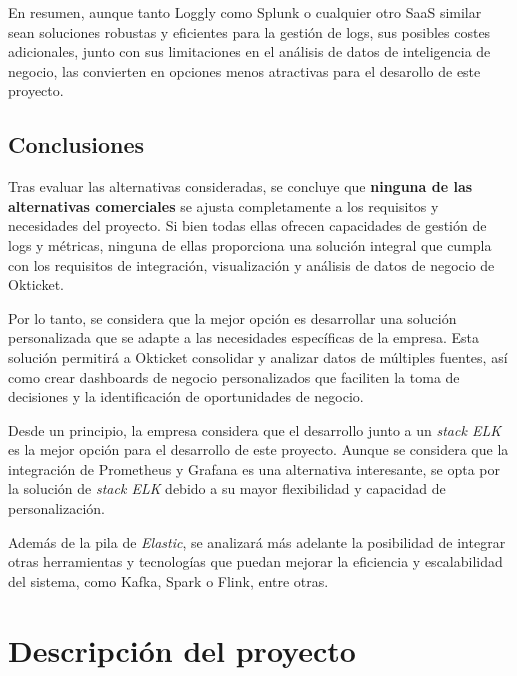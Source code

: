 \newpage{}
En resumen, aunque tanto Loggly como Splunk o cualquier otro SaaS similar
sean soluciones robustas y eficientes para la gestión de logs, sus posibles
costes adicionales, junto con sus limitaciones en el análisis de datos de
inteligencia de negocio, las convierten en opciones menos atractivas para el
desarollo de este proyecto.


\subsection{Conclusiones}
Tras evaluar las alternativas consideradas, se concluye que \textbf{ninguna de
las alternativas comerciales} se ajusta completamente a los requisitos y
necesidades del proyecto. Si bien todas ellas ofrecen capacidades de gestión de
logs y métricas, ninguna de ellas proporciona una solución integral que cumpla
con los requisitos de integración, visualización y análisis de datos de negocio
de Okticket.

Por lo tanto, se considera que la mejor opción es desarrollar una solución
personalizada que se adapte a las necesidades específicas de la empresa. Esta
solución permitirá a Okticket consolidar y analizar datos de múltiples fuentes,
así como crear dashboards de negocio personalizados que faciliten la toma de
decisiones y la identificación de oportunidades de negocio.

Desde un principio, la empresa considera que el desarrollo junto a un
\textit{stack ELK} es la mejor opción para el desarrollo de este proyecto.
Aunque se considera que la integración de Prometheus y Grafana es una
alternativa interesante, se opta por la solución de \textit{stack ELK} debido a
su mayor flexibilidad y capacidad de personalización.

Además de la pila de \textit{Elastic}, se analizará más adelante la posibilidad
de integrar otras herramientas y tecnologías que puedan mejorar la eficiencia y
escalabilidad del sistema, como Kafka, Spark o Flink, entre otras.


\newpage{}
\section{Descripción del proyecto}\label{sec:descripcion}
%

